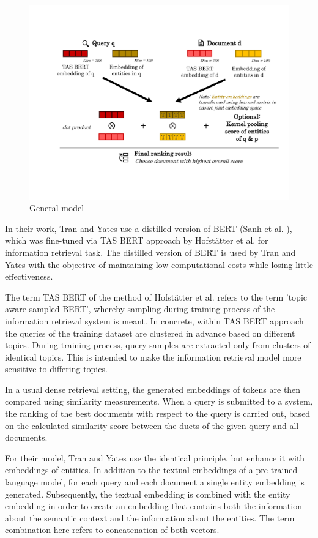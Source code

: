 \begin{figure}[!htb]
    \includegraphics[trim={1.5cm 3cm 1.5cm 3cm}, clip, width=\textwidth]{resources/general_model} 
    \caption{General model}
    \label{fig:general_model}
\end{figure}

In their work, Tran and Yates use a distilled version of BERT (Sanh et al. \cite{sanh2019distilbert}), which was fine-tuned via TAS BERT approach by Hofst{\"a}tter et al. \cite{tasbert} for information retrieval task. The distilled version of BERT is used by Tran and Yates with the objective of maintaining low computational costs while losing little effectiveness. 

The term TAS BERT of the method of Hofst{\"a}tter et al. refers to the term 'topic aware sampled BERT', whereby sampling during training process of the information retrieval system is meant. In concrete, within TAS BERT approach the queries of the training dataset are clustered in advance based on different topics. During training process, query samples are extracted only from clusters of identical topics. This is intended to make the information retrieval model more sensitive to differing topics. 

In a usual dense retrieval setting, the generated embeddings of tokens are then compared using similarity measurements. When a query is submitted to a system, the ranking of the best documents with respect to the query is carried out, based on the calculated similarity score between the duets of the given query and all documents. 

For their model, Tran and Yates use the identical principle, but enhance it with embeddings of entities. In addition to the textual embeddings of a pre-trained language model, for each query and each document a single entity embedding is generated. Subsequently, the textual embedding is combined with the entity embedding in order to create an embedding that contains both the information about the semantic context and the information about the entities. The term combination here refers to concatenation of both vectors. 

